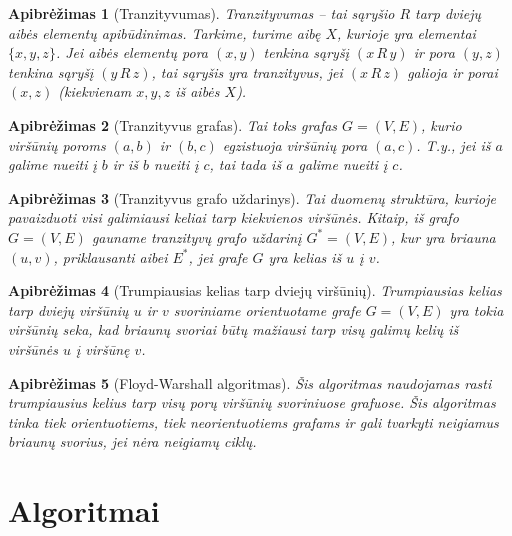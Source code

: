 \documentclass[bibliography=totoc]{article}
\newtheorem{definition}{Apibrėžimas}
\begin{document}
\begin{definition}[Tranzityvumas]
Tranzityvumas – tai sąryšio $R$ tarp dviejų aibės elementų apibūdinimas. Tarkime, turime aibę $X$, kurioje yra elementai $\{x, y, z\}$. Jei aibės elementų pora $(x, y)$ tenkina sąryšį $(x \, R \, y)$ ir pora $(y, z)$ tenkina sąryšį $(y \, R \, z)$, tai sąryšis yra tranzityvus, jei $(x \, R \, z)$ galioja ir porai $(x, z)$ (kiekvienam $x, y, z$ iš aibės $X$). 
\end{definition}



\begin{definition}[Tranzityvus grafas]
    Tai toks grafas $G = (V, E)$, kurio viršūnių poroms $(a, b)$ ir $(b, c)$ egzistuoja viršūnių pora $(a, c)$. T.y., jei iš $a$ galime nueiti į $b$ ir iš $b$ nueiti į $c$, tai tada iš $a$ galime nueiti į $c$.
\end{definition}

\begin{definition}[Tranzityvus grafo uždarinys]
    Tai duomenų struktūra, kurioje pavaizduoti visi galimiausi keliai tarp kiekvienos viršūnės. Kitaip, iš grafo $G = (V, E)$ gauname tranzityvų grafo uždarinį $G^* = (V, E)$, kur yra briauna $(u, v)$, priklausanti aibei $E^*$, jei grafe $G$ yra kelias iš $u$ į $v$.
\end{definition}

\begin{definition}[Trumpiausias kelias tarp dviejų viršūnių]
Trumpiausias kelias tarp dviejų viršūnių $u$ ir $v$ svoriniame orientuotame grafe $G=(V, E)$ yra tokia viršūnių seka, kad briaunų svoriai būtų mažiausi tarp visų galimų kelių iš viršūnės $u$ į viršūnę $v$.
\end{definition}

\begin{definition}[Floyd-Warshall algoritmas]
    Šis algoritmas naudojamas rasti trumpiausius kelius tarp visų porų viršūnių svoriniuose grafuose. Šis algoritmas tinka tiek orientuotiems, tiek neorientuotiems grafams ir gali tvarkyti neigiamus briaunų svorius, jei nėra neigiamų ciklų.
\end{definition}











\newpage
\section{Algoritmai}
\end{document}
